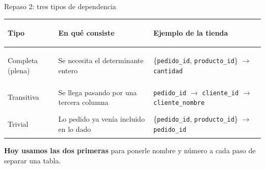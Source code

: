 \documentclass[aspectratio=169,10pt,c]{beamer}
\newcommand{\fdep}{$\rightarrow$}
\begin{document}
\begin{frame}{Repaso 2: tres tipos de dependencia}
\begin{center}
\footnotesize{}
\begin{tabular}{>{\bfseries\raggedright\arraybackslash}p{2.7cm}>{\raggedright\arraybackslash}p{4.3cm}>{\raggedright\arraybackslash}p{4.1cm}}
\toprule
Tipo & En qué consiste & Ejemplo de la tienda \\
\midrule
Completa (plena) & Se necesita el determinante entero & \{\texttt{pedido\_id}, \texttt{producto\_id}\} \fdep{} \texttt{cantidad} \\[4pt]
Transitiva & Se llega pasando por una tercera columna & \texttt{pedido\_id} \fdep{} \texttt{cliente\_id} \fdep{} \texttt{cliente\_nombre} \\[4pt]
Trivial & Lo pedido ya venía incluido en lo dado & \{\texttt{pedido\_id}, \texttt{producto\_id}\} \fdep{} \texttt{pedido\_id} \\
\bottomrule
\end{tabular}
\end{center}
\vspace{0.3cm}
\small \textbf{Hoy usamos las dos primeras} para ponerle nombre y número a cada paso de separar una tabla.
\end{frame}
\end{document}
